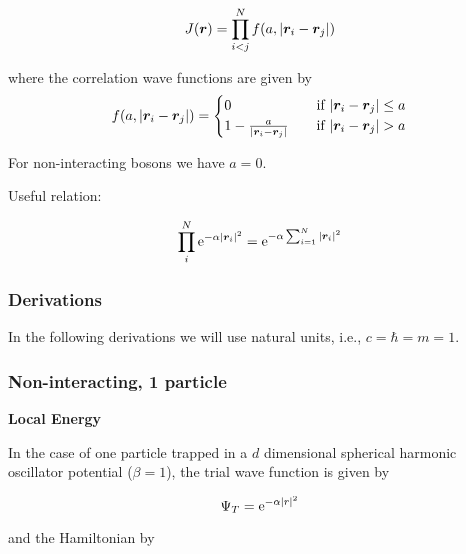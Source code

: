 \begin{equation}
    J \qty(\bm{r}) = \prod_{i<j}^N f \qty(a, \abs{\bm{r}_i - \bm{r}_j})
\end{equation}

where the correlation wave functions are given by
\begin{equation*}
    f \qty(a, \abs{\bm{r}_i - \bm{r}_j}) = 
    \begin{cases}
        0 \quad &\text{if } \abs{\bm{r}_i - \bm{r}_j} \leq a
        \\
        1 - \frac{a}{\abs{\bm{r}_i - \bm{r}_j}} \quad &\text{if } \abs{\bm{r}_i - \bm{r}_j} > a
    \end{cases}
\end{equation*}

For non-interacting bosons we have $a = 0$.

Useful relation: 

\begin{equation}\label{eq:slater_spherical}
    \prod_i^N \mathrm{e}^{-\alpha \abs{\bm{r}_i}^2} = \mathrm{e}^{-\alpha \sum_{i=1}^N \abs{\bm{r}_i}^2}
\end{equation} 


\subsubsection*{Derivations}

In the following derivations we will use natural units, i.e., $c = \hbar = m = 1$.

\subsubsection*{Non-interacting, 1 particle}

\textbf{Local Energy}

In the case of one particle trapped in a $d$ dimensional spherical harmonic oscillator potential ($\beta = 1$), the trial wave function is given by 

\begin{equation*}
    \Psi_T = \mathrm{e}^{-\alpha \abs{r}^2}
\end{equation*}

and the Hamiltonian by

